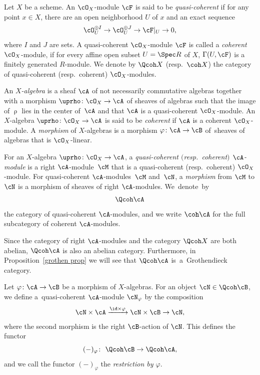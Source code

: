 Let $X$ be a scheme. An $\cO_X$-module $\cF$ is said to be {\it quasi-coherent} if for any point $x\in X$, there are an open neighborhood $U$ of $x$
and an exact sequence
\begin{gather*}
\cO_U^{\oplus I}\to \cO_U^{\oplus J}\to \cF|_U\to0,
\end{gather*}
where $I$ and $J$ are sets. A quasi-coherent $\cO_X$-module $\cF$ is called a {\it coherent} $\cO_X$-module, if for every affine open subset $U=\Spec R$ of $X$, $\Gamma(U,\cF)$ is a finitely generated $R$-module. We denote by $\Qcoh X$ (resp.\ $\coh X$) the category of quasi-coherent (resp.\ coherent) $\cO_X$-modules.

\begin{dfn}
An {\it $X$-algebra} is a sheaf $\cA$ of not necessarily commutative algebras together with a morphism $\uprho\colon \cO_X\to \cA$ of sheaves of algebras such that the image of $\uprho$ lies in the center of~$\cA$ and that $\cA$ is a quasi-coherent $\cO_X$-module. An $X$-algebra $\uprho\colon \cO_X\to \cA$ is said to be {\it coherent} if $\cA$ is a coherent $\cO_X$-module. A {\it morphism} of $X$-algebras is a morphism $\varphi\colon \cA\to \cB$ of~sheaves of algebras that is $\cO_X$-linear.

For an $X$-algebra $\uprho\colon \cO_X\to\cA$, a {\it quasi-coherent $($resp.\ coherent$)$ $\cA$-module} is a right $\cA$-mo\-dule~$\cM$ that is a quasi-coherent (resp.\ coherent) $\cO_X$-module. For quasi-coherent $\cA$-modu\-les~$\cM$ and~$\cN$, a {\it morphism} from $\cM$ to $\cN$ is a morphism of sheaves of right $\cA$-modules. We~denote~by\vspace{-.7ex}
\begin{gather*}
\Qcoh \cA
\end{gather*}
the category of quasi-coherent $\cA$-modules, and we write $\coh \cA$ for the full subcategory of coherent $\cA$-modules.
\end{dfn}

\begin{rem}%
Since the category of right $\cA$-modules and the category $\Qcoh X$ are both abelian, $\Qcoh \cA$ is also an abelian category. Furthermore, in Proposition~\ref{grothen prop} we will see that $\Qcoh \cA$ is~a~Grothendieck category.
\end{rem}

Let $\varphi\colon \cA\to \cB$ be a morphism of $X$-algebras. For an object $\cN\in \Qcoh \cB$, we define a~qua\-si-coherent $\cA$-module $\cN_{\varphi}$ by the composition\vspace{-.7ex}
 \begin{gather*}
 \cN\times \cA\xrightarrow{\id\times \varphi} \cN\times \cB\to \cN,
 \end{gather*}
 where the second morphism is the right $\cB$-action of $\cN$. This defines the functor\vspace{-.7ex}
\begin{equation}\label{restriction}
(-)_{\varphi}\colon\ \Qcoh \cB\to \Qcoh \cA,
\end{equation}
and we call the functor $(-)_{\varphi}$ the {\it restriction by $\varphi$}.

